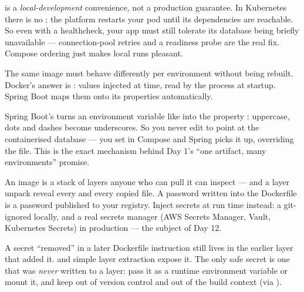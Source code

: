 \begin{prodtip}
 is a \emph{local-development} convenience, not a production guarantee. In Kubernetes there is no ; the platform restarts your pod until its dependencies are reachable. So even with a healthcheck, your app must still tolerate its database being briefly unavailable --- connection-pool retries and a readiness probe are the real fix. Compose ordering just makes local runs pleasant.
\end{prodtip}


 The same image must behave differently per environment without being rebuilt. Docker's answer is : values injected at  time, read by the process at startup. Spring Boot maps them onto its properties automatically.

 Spring Boot's  turns an environment variable like  into the property : uppercase, dots and dashes become underscores. So you never edit  to point at the containerised database --- you set  in Compose and Spring picks it up, overriding the file. This is the exact mechanism behind Day 1's ``one artifact, many environments'' promise.


 An image is a stack of layers anyone who can pull it can inspect ---  and a layer unpack reveal every  and every copied file. A password written into the Dockerfile is a password published to your registry. Inject secrets at run time instead: a git-ignored  locally, and a real secrets manager (AWS Secrets Manager, Vault, Kubernetes Secrets) in production --- the subject of Day 12.

\begin{secwarn}
A secret ``removed'' in a later Dockerfile instruction still lives in the earlier layer that added it.  and simple layer extraction expose it. The only safe secret is one that was \emph{never} written to a layer: pass it as a runtime environment variable or mount it, and keep  out of version control and out of the build context (via ).
\end{secwarn}

